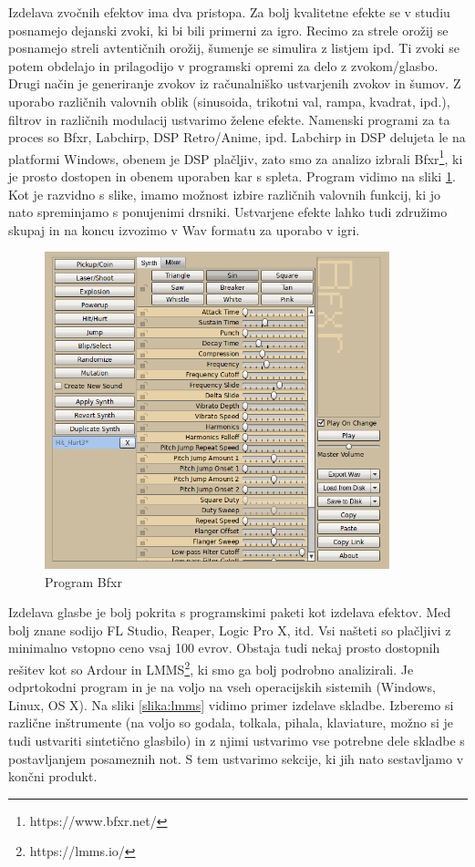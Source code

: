 \documentclass[12pt,a4paper,twoside]{book}
\begin{document}
Izdelava zvočnih efektov ima dva pristopa. Za bolj kvalitetne efekte se v studiu posnamejo dejanski zvoki, ki bi bili primerni za igro. Recimo za strele orožij se posnamejo streli avtentičnih orožij, šumenje se simulira z listjem ipd. Ti zvoki se potem obdelajo in prilagodijo v programski opremi za delo z zvokom/glasbo. Drugi način je generiranje zvokov iz računalniško ustvarjenih zvokov in šumov. Z uporabo različnih valovnih oblik (sinusoida, trikotni val, rampa, kvadrat, ipd.), filtrov in različnih modulacij ustvarimo želene efekte. Namenski programi za ta proces so Bfxr, Labchirp, DSP Retro/Anime, ipd. Labchirp in DSP delujeta le na platformi Windows, obenem je DSP plačljiv, zato smo za analizo izbrali Bfxr\footnote{https://www.bfxr.net/}, ki je prosto dostopen in obenem uporaben kar s spleta. Program vidimo na sliki \ref{slika:bfxr}. Kot je razvidno s slike, imamo možnost izbire različnih valovnih funkcij, ki jo nato spreminjamo s ponujenimi drsniki. Ustvarjene efekte lahko tudi združimo skupaj in na koncu izvozimo v Wav formatu za uporabo v igri.

\begin{figure}[h]
	\centering
	\includegraphics[width=10cm]{bfxr}
	\caption{Program Bfxr}
	\label{slika:bfxr}
\end{figure}

Izdelava glasbe je bolj pokrita s programskimi paketi kot izdelava efektov. Med bolj znane sodijo FL Studio, Reaper, Logic Pro X, itd. Vsi našteti so plačljivi z minimalno vstopno ceno vsaj 100 evrov. Obstaja tudi nekaj prosto dostopnih rešitev kot so Ardour in LMMS\footnote{https://lmms.io/}, ki smo ga bolj podrobno analizirali. Je odprtokodni program in je na voljo na vseh operacijskih sistemih (Windows, Linux, OS X). Na sliki \ref{slika:lmms} vidimo primer izdelave skladbe. Izberemo si različne inštrumente (na voljo so godala, tolkala, pihala, klaviature, možno si je tudi ustvariti sintetično glasbilo) in z njimi ustvarimo vse potrebne dele skladbe s postavljanjem posameznih not. S tem ustvarimo sekcije, ki jih nato sestavljamo v končni produkt.
\end{document}
